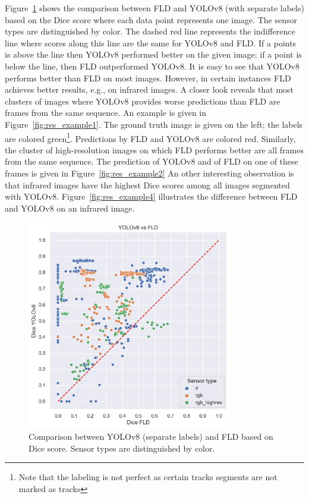 \documentclass[Master,MDS,english]{BASE/twbook} %
\begin{document}
Figure~\ref{fig:yolo_vs_fld} shows the comparison between FLD and YOLOv8 (with separate labels) based on the Dice score where each data point represents one image. The sensor types are distinguished by color. The dashed red line represents the indifference line where scores along this line are the same for YOLOv8 and FLD. If a points is above the line then YOLOv8 performed better on the given image; if a point is below the line, then FLD outperformed YOLOv8. It is easy to see that YOLOv8 performs better than FLD on most images. However, in certain instances FLD achieves better results, e.g., on infrared images. A closer look reveals that most clusters of images where YOLOv8 provides worse predictions than FLD are frames from the same sequence. 
An example is given in Figure~\ref{fig:res_example1}. The ground truth image is given on the left; the labels are colored green\footnote{Note that the labeling is not perfect as certain tracks segments are not marked as tracks}. Predictions by FLD and YOLOv8 are colored red. 
Similarly, the cluster of high-resolution images on which FLD performs better are all frames from the same sequence. The prediction of YOLOv8 and of FLD on one of these frames is given in Figure~\ref{fig:res_example2}
An other interesting observation is that infrared images have the highest Dice scores among all images segmented with YOLOv8. Figure~\ref{fig:res_example4} illustrates the difference between FLD and YOLOv8 on an infrared image.



\begin{figure}[h]
\centering
\includegraphics[width=0.8\textwidth]{images/results/dice_fld_vs_yolo_nl}
\caption{Comparison between YOLOv8 (separate labels) and FLD based on Dice score. Sensor types are distinguished by color. }
\label{fig:yolo_vs_fld}
\end{figure}
\end{document}
